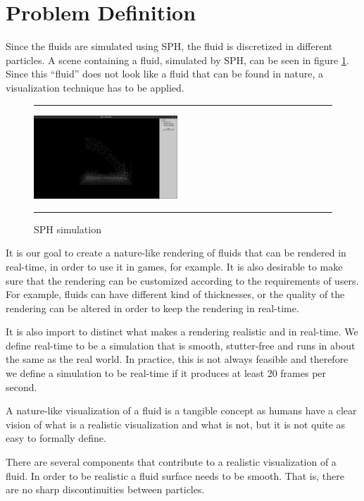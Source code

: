 \section{Problem Definition}
Since the fluids are simulated using SPH, the fluid is discretized in different particles.
A scene containing a fluid, simulated by SPH, can be seen in figure \ref{fig:sph}.
Since this ``fluid'' does not look like a fluid that can be found in nature, a visualization technique has to be applied.

\begin{figure}[!th]
\hrule
\begin{center}
\vspace*{2ex}\includegraphics[width=0.48\textwidth]{pictures/sph.png}
\end{center}
\caption{SPH simulation}
\label{fig:sph} 
\vspace*{2ex}
\hrule
\end{figure}

It is our goal to create a nature-like rendering of fluids that can be rendered in real-time, in order to use it in games, for example.
It is also desirable to make sure that the rendering can be customized according to the requirements of users.
For example, fluids can have different kind of thicknesses, or the quality of the rendering can be altered in order to keep the rendering in real-time.

It is also import to distinct what makes a rendering realistic and in real-time. 
We define real-time to be a simulation that is smooth, stutter-free and runs in about the same as the real world.
In practice, this is not always feasible and therefore we define a simulation to be real-time if it produces at least 20 frames per second.

A nature-like visualization of a fluid is a tangible concept as humans have a clear vision of what is a realistic visualization and what is not, but it is not quite as easy to formally define.

There are several components that contribute to a realistic visualization of a fluid.
In order to be realistic a fluid surface needs to be smooth. That is, there are no sharp discontinuities between particles.

